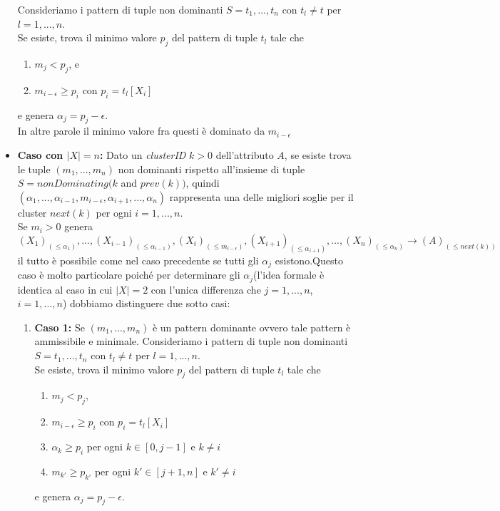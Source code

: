 \begin{itemize}
		Consideriamo i pattern di tuple non dominanti $S=t_{1},...,t_{n}$ con $t_{l}\neq t$ per $l=1,...,n$.\\
		Se esiste, trova il minimo valore $p_{j}$ del pattern di tuple $t_{l}$ tale che
			\begin{enumerate}
				\item  $m_{j}<p_{j}$, e
				\item $m_{i-\epsilon} \geq p_{i}$ con $p_{i}=t_{l}[X_{i}]$
			\end{enumerate}  
		e genera $\alpha_{j}= p_{j} -\epsilon$.\\ In altre parole il minimo valore fra questi è dominato da $m_{i-\epsilon}$
		\item 
			\textbf{Caso con $|X|=n$:} Dato un \textit{clusterID} $k>0$ dell'attributo $A$, se esiste trova le tuple $(m_{1},...,m_{n})$ non dominanti rispetto all'insieme di tuple \\$S=nonDominating(k$ and $prev(k))$, quindi $(\alpha_{1},...,\alpha_{i-1},m_{i-\epsilon},\alpha_{i+1},...,\alpha_{n})$ rappresenta una delle migliori soglie per il cluster $next(k)$ per ogni $i=1,...,n$.  \\
			Se $m_{i} >0$ genera
			\begin{equation*}
				(X_{1})_{(\leq \alpha_{1})},...,(X_{i-1})_{(\leq \alpha_{i-1})},(X_{i})_{(\leq m_{i-\epsilon})},(X_{i+1})_{(\leq \alpha_{i+1})},...,(X_{n})_{(\leq \alpha_{n})} \rightarrow (A)_{(\leq next(k))}
			\end{equation*}
			il tutto è possibile come nel caso precedente se tutti gli $\alpha_{j}$ esistono.Questo caso è molto particolare poiché per determinare gli $\alpha_{j}$(l'idea formale è identica al caso in cui  $|X|=2$ con l'unica differenza che $j=1,...,n$, $i=1,...,n$) dobbiamo distinguere due sotto casi:
				\begin{enumerate}
				\item  \textbf{Caso 1:} Se $(m_{1},...,m_{n})$ è un pattern dominante ovvero tale pattern è ammissibile e minimale.
					Consideriamo i pattern di tuple non dominanti $S=t_{1},...,t_{n}$ con $t_{l}\neq t$ per $l=1,...,n$.\\
				Se esiste, trova il minimo valore $p_{j}$ del pattern di tuple $t_{l}$ tale che
				\begin{enumerate}
					\item  $m_{j}<p_{j}$, 
					\item $m_{i-\epsilon} \geq p_{i}$ con $p_{i}=t_{l}[X_{i}]$
					\item $\alpha_{k} \geq p_{i}$ per ogni $k \in [0,j-1]$ e $k \neq i$
					\item $m_{k'} \geq p_{k'}$ per ogni $k' \in [j+1,n]$ e $k' \neq i$
				\end{enumerate}  
				e genera $\alpha_{j}= p_{j} -\epsilon$.\\
				 

\end{enumerate}
\end{itemize}
